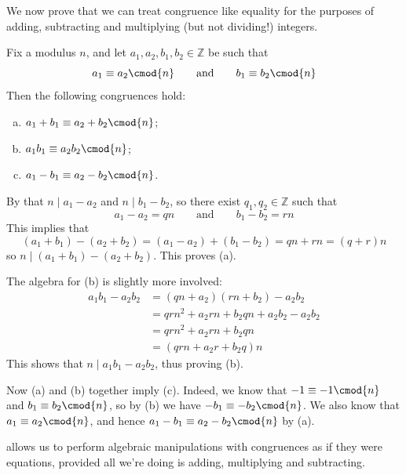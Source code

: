 We now prove that we can treat congruence like equality for the purposes of adding, subtracting and multiplying (but not dividing!) integers.

\begin{theorem}\label{thmModularArithmetic}
Fix a modulus $n$, and let $a_1,a_2,b_1,b_2 \in \mathbb{Z}$ be such that
\[ a_1 \equiv a_2 \cmod{n} \qquad \text{and} \qquad b_1 \equiv b_2 \cmod{n} \]
Then the following congruences hold:
\begin{enumerate}[(a)]
\item $a_1+b_1 \equiv a_2+b_2 \cmod{n}$;
\item $a_1b_1 \equiv a_2b_2 \cmod{n}$;
\item $a_1-b_1 \equiv a_2-b_2 \cmod{n}$.
\end{enumerate}
\end{theorem}
\begin{cproof} By  that $n \mid a_1-a_2$ and $n \mid b_1-b_2$, so there exist $q_1,q_2 \in \mathbb{Z}$ such that
\[ a_1-a_2 = qn \qquad \text{and} \qquad b_1-b_2=rn \]
This implies that
\[ (a_1+b_1)-(a_2+b_2) = (a_1-a_2)+(b_1-b_2) = qn+rn = (q+r)n \]
so $n \mid (a_1+b_1)-(a_2+b_2)$. This proves (a).

The algebra for (b) is slightly more involved:
\begin{align*}
a_1b_1-a_2b_2 &= (qn+a_2)(rn+b_2) - a_2b_2 \\
&= qrn^2 + a_2rn + b_2qn + a_2b_2 - a_2b_2 \\
&= qrn^2 + a_2rn + b_2qn \\
&= (qrn + a_2r + b_2q)n
\end{align*}
This shows that $n \mid a_1b_1 - a_2b_2$, thus proving (b).

Now (a) and (b) together imply (c). Indeed, we know that $-1 \equiv -1 \cmod{n}$ and $b_1 \equiv b_2 \cmod{n}$, so by (b) we have $-b_1 \equiv -b_2 \cmod{n}$. We also know that $a_1 \equiv a_2 \cmod{n}$, and hence $a_1-b_1 \equiv a_2-b_2 \cmod{n}$ by (a).
\end{cproof}

 allows us to perform algebraic manipulations with congruences as if they were equations, provided all we're doing is adding, multiplying and subtracting.

